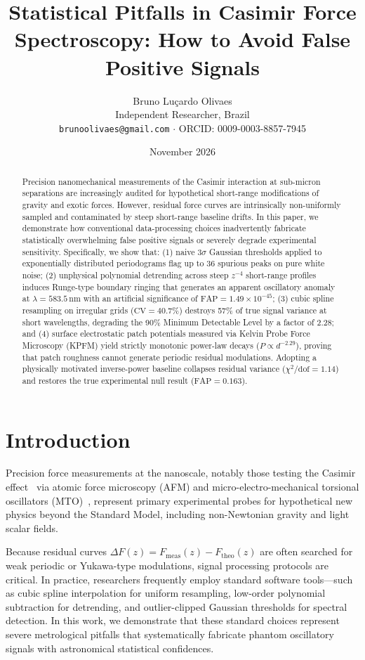 \documentclass[10pt,twocolumn,a4paper]{article}
\title{\textbf{Statistical Pitfalls in Casimir Force Spectroscopy: How to Avoid False Positive Signals}}
\author{Bruno Lu\c{c}ardo Olivaes \\ \small Independent Researcher, Brazil \\ \small \texttt{brunoolivaes@gmail.com} $\cdot$ ORCID: 0009-0003-8857-7945}
\date{November 2026}
\begin{document}
\maketitle

\begin{abstract}
\noindent Precision nanomechanical measurements of the Casimir interaction at sub-micron separations are increasingly audited for hypothetical short-range modifications of gravity and exotic forces. However, residual force curves are intrinsically non-uniformly sampled and contaminated by steep short-range baseline drifts. In this paper, we demonstrate how conventional data-processing choices inadvertently fabricate statistically overwhelming false positive signals or severely degrade experimental sensitivity. Specifically, we show that: (1) naive $3\sigma$ Gaussian thresholds applied to exponentially distributed periodograms flag up to 36 spurious peaks on pure white noise; (2) unphysical polynomial detrending across steep $z^{-4}$ short-range profiles induces Runge-type boundary ringing that generates an apparent oscillatory anomaly at $\lambda = 583.5\,\mathrm{nm}$ with an artificial significance of $\mathrm{FAP} = 1.49 \times 10^{-45}$; (3) cubic spline resampling on irregular grids ($\mathrm{CV} = 40.7\%$) destroys 57\% of true signal variance at short wavelengths, degrading the 90\% Minimum Detectable Level by a factor of 2.28; and (4) surface electrostatic patch potentials measured via Kelvin Probe Force Microscopy (KPFM) yield strictly monotonic power-law decays ($P \propto d^{-2.29}$), proving that patch roughness cannot generate periodic residual modulations. Adopting a physically motivated inverse-power baseline collapses residual variance ($\chi^2/\mathrm{dof} = 1.14$) and restores the true experimental null result ($\mathrm{FAP} = 0.163$).
\end{abstract}

\section{Introduction}
Precision force measurements at the nanoscale, notably those testing the Casimir effect~\cite{casimir1948,lifshitz1956} via atomic force microscopy (AFM) and micro-electro-mechanical torsional oscillators (MTO)~\cite{decca2003,dejong2025}, represent primary experimental probes for hypothetical new physics beyond the Standard Model, including non-Newtonian gravity and light scalar fields.

Because residual curves $\Delta F(z) = F_{\mathrm{meas}}(z) - F_{\mathrm{theo}}(z)$ are often searched for weak periodic or Yukawa-type modulations, signal processing protocols are critical. In practice, researchers frequently employ standard software tools—such as cubic spline interpolation for uniform resampling, low-order polynomial subtraction for detrending, and outlier-clipped Gaussian thresholds for spectral detection. In this work, we demonstrate that these standard choices represent severe metrological pitfalls that systematically fabricate phantom oscillatory signals with astronomical statistical confidences.
\end{document}
